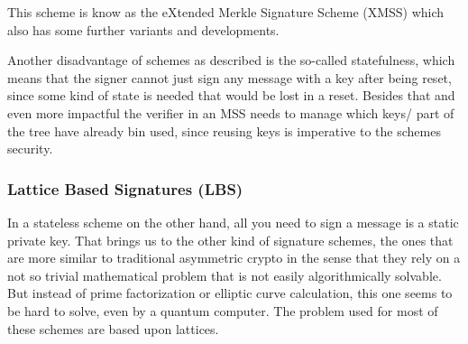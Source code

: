 \documentclass[conference]{IEEEtran}
\begin{document}
This scheme is know as the eXtended Merkle Signature Scheme (XMSS) which also has some further variants and developments. \cite{QR_IoT }

Another disadvantage of schemes as described is the so-called statefulness, which means that the signer cannot just sign any message with a key after being reset, since some kind of state is needed that would be lost in a reset. \cite{QR_sigs} 
Besides that and even more impactful the verifier in an MSS needs to manage which keys/ part of the tree have already bin used, since reusing keys is imperative to the schemes security.

\subsubsection{Lattice Based Signatures (LBS)}\label{LBS}
In a stateless scheme on the other hand, all you need to sign a message is a static private key.
That brings us to the other kind of signature schemes, the ones that are more similar to traditional asymmetric crypto in the sense that they rely on a not so trivial mathematical problem that is not easily algorithmically solvable. But instead of prime factorization or elliptic curve calculation, this one seems to be hard to solve, even by a quantum computer. The problem used for most of these schemes are based upon lattices.
\end{document}
